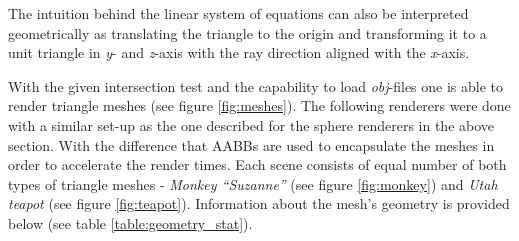 \documentclass{article}
\begin{document}
The intuition behind the linear system of equations can also be interpreted geometrically as translating the triangle to the origin and transforming it to a unit triangle in \textit{y}- and \textit{z}-axis with the ray direction aligned with the \textit{x}-axis. 

\vspace*{\baselineskip}

With the given intersection test and the capability to load \textit{obj}-files one is able to render triangle meshes (see figure \ref{fig:meshes}). The following renderers were done with a similar set-up as the one described for the sphere renderers in the above section. With the difference that AABBs are used to encapsulate the meshes in order to accelerate the render times. Each scene consists of equal number of both types of triangle meshes - \textit{Monkey ``Suzanne''} (see figure \ref{fig:monkey}) and \textit{Utah teapot} (see figure \ref{fig:teapot}). Information about the mesh's geometry is provided below (see table \ref{table:geometry_stat}).
\end{document}
